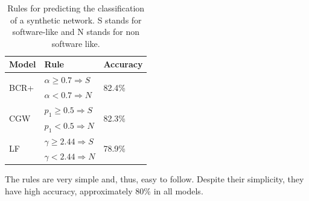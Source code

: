 \begin{table}
\caption{Rules for predicting the classification of a synthetic network. S
stands for software-like and N stands for non software like.}
\centering
\begin{tabular}{|l|l|l|}
\hline
Model & Rule & Accuracy \\
\hline 
\hline
\multirow{2}{*}{BCR+}
     & $\alpha \ge 0.7 \Rightarrow S$ & \multirow{2}{*}{82.4\%}  \\ 
     & $\alpha < 0.7 \Rightarrow N$ & \\ 
\hline
\multirow{2}{*}{CGW}
     & $p_1 \ge 0.5 \Rightarrow S$ & \multirow{2}{*}{82.3\%} \\  
     & $p_1 < 0.5 \Rightarrow N$ & \\  
\hline
\multirow{2}{*}{LF}   
     & $\gamma \ge 2.44 \Rightarrow S$ & \multirow{2}{*}{78.9\%} \\ 
     & $\gamma < 2.44 \Rightarrow N$ & \\ 
\hline
\end{tabular}
\label{tab:rules}
\end{table}

The rules are very simple and, thus, easy to follow. Despite their simplicity,
they have high accuracy, approximately 80\% in all models.  

%


%
%

